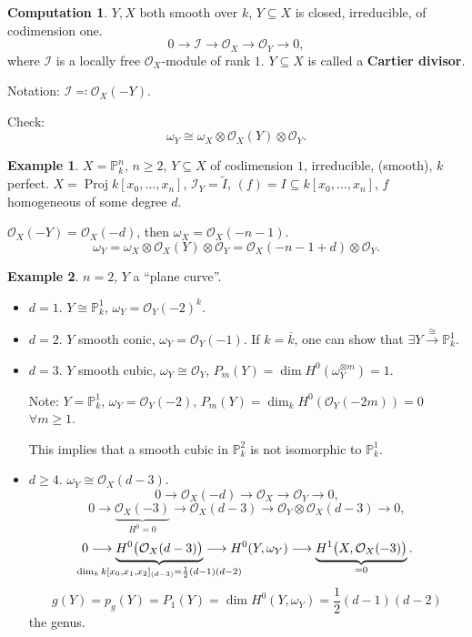 \documentclass[12pt]{article}
\DeclareMathOperator{\Proj}{Proj}
\theoremstyle{definition}
\newtheorem*{example}{Example}
\newtheorem*{computation}{Computation}
\begin{document}
\begin{computation}
$Y,X$ both smooth over $k$, $Y\subseteq X$ is closed, irreducible, of codimension one.
\[0\longrightarrow\mathcal{I}\longrightarrow\mathcal{O}_X\longrightarrow\mathcal{O}_Y\longrightarrow0,\]
where $\mathcal{I}$ is a locally free $\mathcal{O}_X$-module of rank $1$. $Y\subseteq X$ is called a \textbf{Cartier divisor}.

Notation: $\mathcal{I}\eqqcolon\mathcal{O}_X(-Y)$.

Check:
\[\omega_Y\cong\omega_X\otimes\mathcal{O}_X(Y)\otimes\mathcal{O}_Y.\]

\begin{example}
$X=\mathbb{P}_k^n$, $n\geq2$, $Y\subseteq X$ of codimension $1$, irreducible, (smooth), $k$ perfect. $X=\Proj k[x_0,\ldots,x_n]$, $\mathcal{I}_Y=\widetilde{I}$, $(f)=I\subseteq k[x_0,\ldots,x_n]$, $f$ homogeneous of some degree $d$.

$\mathcal{O}_X(-Y)=\mathcal{O}_X(-d)$, then $\omega_X=\mathcal{O}_X(-n-1)$.
\[\omega_Y=\omega_X\otimes\mathcal{O}_X(Y)\otimes\mathcal{O}_Y=\mathcal{O}_X(-n-1+d)\otimes\mathcal{O}_Y.\]
\end{example}

\begin{example}
$n=2$, $Y$ a ``plane curve''.

\begin{itemize}
\item $d=1$. $Y\cong\mathbb{P}_k^1$, $\omega_Y=\mathcal{O}_Y(-2)^k$.

\item $d=2$. $Y$ smooth conic, $\omega_Y=\mathcal{O}_Y(-1)$. If $k=\overline{k}$, one can show that $\exists Y\xrightarrow{\cong}\mathbb{P}_k^1$.

\item $d=3$. $Y$ smooth cubic, $\omega_Y\cong\mathcal{O}_Y$, $P_m(Y)=\dim H^0(\omega_Y^{\otimes m})=1$.

Note: $Y=\mathbb{P}_k^1$, $\omega_Y=\mathcal{O}_Y(-2)$, $P_m(Y)=\dim_kH^0(\mathcal{O}_Y(-2m))=0$ $\forall m\geq1$.

This implies that a smooth cubic in $\mathbb{P}_k^2$ is not isomorphic to $\mathbb{P}_k^1$.

\item $d\geq4$. $\omega_Y\cong\mathcal{O}_X(d-3)$.
\[0\longrightarrow\mathcal{O}_X(-d)\longrightarrow\mathcal{O}_X\longrightarrow\mathcal{O}_Y\longrightarrow0,\]
\[0\longrightarrow\underbrace{\mathcal{O}_X(-3)}_{H^0=0}\longrightarrow\mathcal{O}_X(d-3)\longrightarrow\mathcal{O}_Y\otimes\mathcal{O}_X(d-3)\longrightarrow0,\]
\[0\longrightarrow\underbrace{H^0\big(\mathcal{O}_X(d-3)\big)}_{\mathclap{\dim_kk[x_0,x_1,x_2]_{(d-3)}=\frac{1}{2}(d-1)(d-2)}}\longrightarrow H^0(Y,\omega_Y)\longrightarrow\underbrace{H^1\big(X,\mathcal{O}_X(-3)\big)}_{=0}.\]
\[g(Y)=p_g(Y)=P_1(Y)=\dim H^0(Y,\omega_Y)=\frac{1}{2}(d-1)(d-2)\]
the genus.
\end{itemize}


\end{example}
\end{computation}
\end{document}
